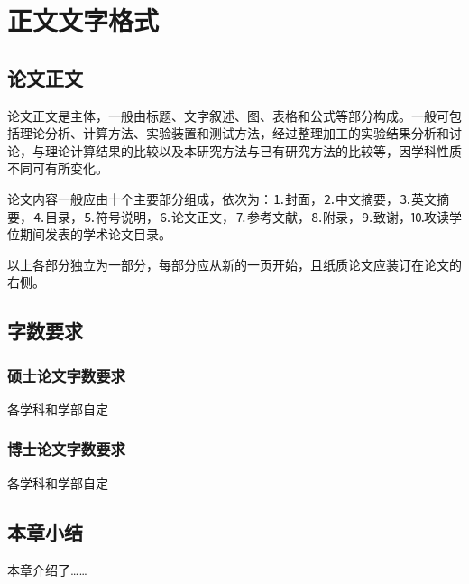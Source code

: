 \section{正文文字格式}
\subsection{论文正文}
论文正文是主体，一般由标题、文字叙述、图、表格和公式等部分构成。一般可包括理论分析、计算方法、实验装置和测试方法，经过整理加工的实验结果分析和讨论，与理论计算结果的比较以及本研究方法与已有研究方法的比较等，因学科性质不同可有所变化。\par
论文内容一般应由十个主要部分组成，依次为：⒈封面，⒉中文摘要，⒊英文摘要，⒋目录，⒌符号说明，⒍论文正文，⒎参考文献，⒏附录，⒐致谢，⒑攻读学位期间发表的学术论文目录。\par
以上各部分独立为一部分，每部分应从新的一页开始，且纸质论文应装订在论文的右侧。\par
\subsection{字数要求}
\subsubsection{硕士论文字数要求}
各学科和学部自定
\subsubsection{博士论文字数要求}
各学科和学部自定
\subsection{本章小结}
本章介绍了……

\newpage
